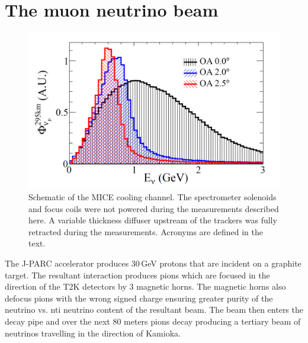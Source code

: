 \documentclass[%
 reprint,
 amsmath,amssymb,
 aps,
]{revtex4-2}
\begin{document}
\section{\label{Sect:Data}The muon neutrino beam}
\begin{figure}[htbp]
\begin{center}
\includegraphics[width=\textwidth]{images/figure-t2k-beam-off-axis.png}
\end{center}
\caption{Schematic of the MICE cooling channel. The spectrometer solenoids and focus coils were not powered during the measurements described here. A variable thickness diffuser upstream of the trackers was fully retracted during the measurements. Acronyms are defined in the text.}
\label{fig:micecc}
\end{figure}

The J-PARC accelerator produces 30\,GeV protons that are incident on a graphite target. The resultant interaction produces pions which are focused in the direction of the T2K detectors by 3 magnetic horns. The magnetic horns also defocus pions with the wrong signed charge ensuring greater purity of the neutrino vs. nti neutrino content of the resultant beam. The beam then enters the decay pipe and over the next 80 meters pions decay producing a tertiary beam of neutrinos travelling in the direction of Kamioka. 
\end{document}
